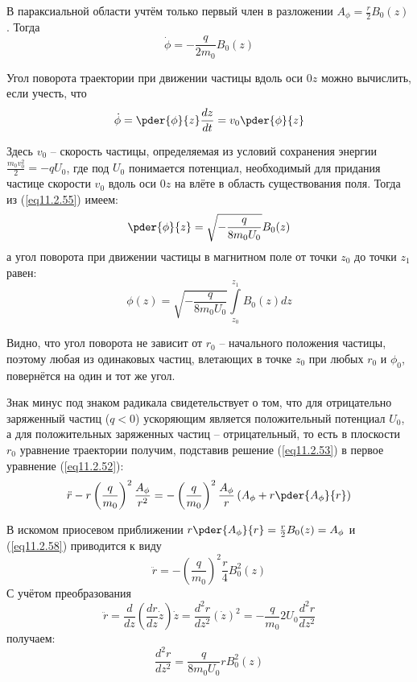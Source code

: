 В параксиальной области учтём только первый член в разложении 
\( A_\phi = \frac{r}{2} B_0(z)\). Тогда
\[
	\dot{\phi} = -\frac{q}{2m_0}B_0(z)
\]

Угол поворота траектории при движении частицы вдоль оси \( 0z \) можно 
вычислить, если учесть, что 
\begin{equation}
	\dot{\phi} = \pder{\phi}{z}\frac{dz}{dt} = v_0 \pder{\phi}{z}
	\label{eq11.2.55}
\end{equation}

Здесь \( v_0 \) -- скорость частицы, определяемая из условий сохранения 
энергии \( \frac{m_0 v_0^2}{2} = -qU_0 \), где под \( U_0 \) понимается 
потенциал, необходимый для придания частице скорости \( v_0 \) вдоль оси 
\( 0z \) на влёте в область существования поля. Тогда из (\ref{eq11.2.55}) 
имеем:
\[
	\pder{\phi}{z} = \sqrt{-\frac{q}{8m_0 U_0}} B_0(z)
\]
а угол поворота при движении частицы в магнитном поле от точки \( z_0 \) до 
точки \( z_1 \) равен:
\[
	\phi(z) = \sqrt{-\frac{q}{8m_0 U_0}} \int\limits_{z_0}^{z_1} B_0(z) dz
\]

Видно, что угол поворота не зависит от \( r_0 \) -- начального положения 
частицы, поэтому любая из одинаковых частиц, влетающих в точке \( z_0 \) при 
любых \( r_0 \) и \( \phi_0 \), повернётся на один и тот же угол. 

Знак минус под знаком радикала свидетельствует о том, что для отрицательно 
заряженный частиц (\( q < 0 \)) ускоряющим является положительный потенциал 
\( U_0 \), а для положительных заряженных частиц -- отрицательный, то есть в 
плоскости \( r_0 \) уравнение траектории получим, подставив решение 
(\ref{eq11.2.53}) в первое уравнение (\ref{eq11.2.52}):
\begin{equation}
	\ddot{r} - r\left( \frac{q}{m_0}\right)^2 \frac{A_\phi}{r^2} = 
		-\left( \frac{q}{m_0} \right)^2 \frac{A_\phi}{r}
		\left( A_\phi + r\pder{A_\phi}{r} \right)
	\label{eq11.2.58}
\end{equation}

В искомом приосевом приближении 
\( r\pder{A_\phi}{r} = \frac{r}{2} B_0(z) = A_\phi \) и (\ref{eq11.2.58}) 
приводится к виду
\[
	\ddot{r} = -\left( \frac{q}{m_0} \right)^2 \frac{r}{4} B_0^2(z)
\]
С учётом преобразования
\[
	\ddot{r} = \frac{d}{dz}\left( \frac{dr}{dz}\dot{z} \right)\dot{z} = 
		\frac{d^2 r}{dz^2}(\dot{z})^2 = -\frac{q}{m_0}2U_0\frac{d^2 r}{dz^2}
\]
получаем:
\[
	\frac{d^2 r}{dz^2} = \frac{q}{8m_0 U_0}rB_0^2(z)
\]